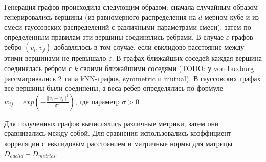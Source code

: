 Генерация графов происходила следующим образом: сначала случайным образом генерировались вершины (из равномерного распределения на $d$-мерном кубе и из смеси гауссовских распределений с различными параметрами смеси), затем по определенным правилам эти вершины соединялись ребрами. В случае $\varepsilon$-графов ребро $(v_i, v_j)$ добавлялось в том случае, если евклидово расстояние между этими вершинами не превышало $\varepsilon$. В графах ближайших соседей каждая вершина соединялась ребром с $k$ своими ближайшими соседями (TODO: у von Luxburg рассматривались 2 типа kNN-графов, symmetric и mutual). В гауссовских графах все вершины были соединены, а веса ребер определялись по формуле $w_{ij} = exp(-\frac{||v_i - v_j||^2} {\sigma^2} )$, где параметр $\sigma > 0$

Для полученных графов вычислялись различные метрики, затем они сравнивались между собой. Для сравнения использовались коэффициент корреляции с евклидовым расстоянием и матричные нормы для матрицы $D_{euclid} - D_{metrics}$.






